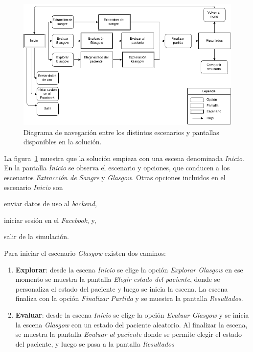 \begin{figure}[H] 
\centering 
\includegraphics[scale=0.5]{solucion/images/grafo_escenas.png}
\caption{Diagrama de navegación entre los distintos escenarios y pantallas
    disponibles en la solución.}
\label{fig:grafo_estados}
\end{figure}

 
La figura~\ref{fig:grafo_estados} muestra que la solución empieza con una escena
denominada \emph{Inicio}. En la pantalla \emph{Inicio} se observa el escenario y 
opciones, que conducen a los escenarios \emph{Extracción de Sangre} y
\emph{Glasgow}. Otras opciones incluidos en el escenario \emph{Inicio} son
\begin{enumerate*}[label=\itshape\alph*\upshape)]
\item enviar datos de uso al \emph{backend},
\item iniciar sesión en el \emph{Facebook}, y,
\item salir de la simulación.
\end{enumerate*}



Para iniciar el escenario \emph{Glasgow} existen dos caminos:
\begin{enumerate}
\item \textbf{Explorar}: desde la escena \emph{Inicio} se elige la opción \emph{Explorar
        Glasgow} en ese momento se muestra la pantalla \emph{Elegir estado del
        paciente}, donde se personaliza el estado del paciente y luego se inicia
    la escena. La escena finaliza con la opción \emph{Finalizar Partida} y se
    muestra la pantalla \emph{Resultados}.
\item \textbf{Evaluar}: desde la escena \emph{Inicio} se elige la opción \emph{Evaluar
        Glasgow} y se inicia la escena \emph{Glasgow} con un estado del paciente
    aleatorio.
    Al finalizar la escena, se muestra la pantalla \emph{Evaluar al paciente}
    donde se permite elegir el estado del paciente, y luego se pasa a la
    pantalla \emph{Resultados}
\end{enumerate}

